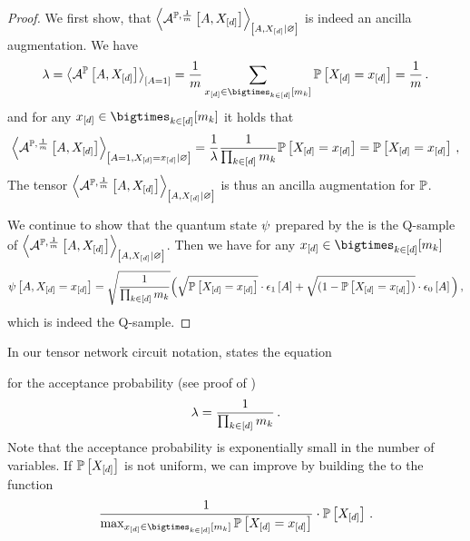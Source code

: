 \begin{proof}
    We first show, that $\left\langle \mathcal{A}^{\mathbb{P},\frac{1}{m}}\left[A,X_{[d]}\right]\right\rangle_{\left[ A,X_{[d]} | \varnothing \right]}$ is indeed an ancilla augmentation.
    We have
    \begin{align*}
        \acceptanceprob
        = \contractionof{\anaugmentationofat{\probtensor}{\avariable,\shortcatvariables}}{\avariable=1}
        = \frac{1}{\catdim}
        \sum_{\shortcatindicesin} \probat{\indexedshortcatvariables}
        = \frac{1}{\catdim} \, .
    \end{align*}
    and for any $\shortcatindicesin$ it holds that
    \begin{align*}
        \left\langle \mathcal{A}^{\mathbb{P},\frac{1}{m}}\left[A,X_{[d]}\right]\right\rangle_{\left[ A=1,X_{[d]}=x_{[d]} | \varnothing \right]}
        = \frac{1}{\lambda} \frac{1}{\prod_{k\in[d]}m_{k}} \mathbb{P}\left[X_{[d]}=x_{[d]}\right]
        = \mathbb{P}\left[X_{[d]}=x_{[d]}\right]\, ,
    \end{align*}
    The tensor $\left\langle \mathcal{A}^{\mathbb{P},\frac{1}{m}}\left[A,X_{[d]}\right]\right\rangle_{\left[ A,X_{[d]} | \varnothing \right]}$ is thus an ancilla augmentation for $\mathbb{P}$.

    We continue to show that the quantum state $\psi$ prepared by the \activationCircuit{} is the Q-sample of $\left\langle \mathcal{A}^{\mathbb{P},\frac{1}{m}}\left[A,X_{[d]}\right]\right\rangle_{\left[ A,X_{[d]} | \varnothing \right]}$.
    Then we have for any $\shortcatindicesin$
    \begin{align*}
        \psi\left[A,X_{[d]}=x_{[d]}\right]
        = \sqrt{\frac{1}{\prod_{k\in[d]}m_{k}}}
        \Big(\sqrt{\mathbb{P}\left[X_{[d]}=x_{[d]}\right]} \cdot \epsilon_{1}\left[A\right]
        + \sqrt{(1- \mathbb{P}\left[X_{[d]}=x_{[d]}\right])} \cdot \epsilon_{0}\left[A\right]\Big) \, ,
    \end{align*}
    which is indeed the Q-sample.
\end{proof}

In our tensor network circuit notation,  states the equation
\begin{center}
    
\end{center}
for the acceptance probability (see proof of )
\begin{align*}
    \lambda = \frac{1}{\prod_{k\in[d]}m_{k}} \, .
\end{align*}
Note that the acceptance probability is exponentially small in the number of variables.
If $\mathbb{P}\left[X_{[d]}\right]$ is not uniform, we can improve by building the \activationCircuit{} to the function
\begin{align*}
    \frac{1}{\max_{\shortcatindicesin}\probat{\indexedshortcatvariables}} \cdot \probwith \, .
\end{align*}

